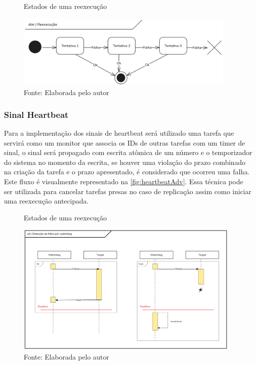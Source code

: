 \begin{figure}[H]
    \centering
    \captionsetup{justification=centering}
    \caption{Estados de uma reexecução}
    \includegraphics[width=0.950\textwidth]{assets/state_reexec.png}
    \captionsetup{justification=raggedright}
    \caption*{Fonte: Elaborada pelo autor}
    \label{fig:stateReexec}
\end{figure}

\subsubsection{Sinal Heartbeat}

Para a implementação dos sinais de heartbeat será utilizado uma tarefa que servirá como um monitor que associa os IDs de outras tarefas com um timer de sinal, o sinal será propagado com escrita atômica de um número e o temporizador do sistema no momento da escrita, se houver uma violação do prazo combinado na criação da tarefa e o prazo apresentado, é considerado que ocorreu uma falha. Este fluxo é visualmente representado na \autoref{fig:heartbeatAdv}. Essa técnica pode ser utilizada para cancelar tarefas presas no caso de replicação assim como iniciar uma reexecução antecipada.

\begin{figure}[H]
    \centering
    \captionsetup{justification=centering}
    \caption{Estados de uma reexecução}
    \includegraphics[width=0.975\textwidth]{assets/heartbeat_signal.png} %
    \captionsetup{justification=raggedright}
    \caption*{Fonte: Elaborada pelo autor}
    \label{fig:heartbeatAdv}
\end{figure}

